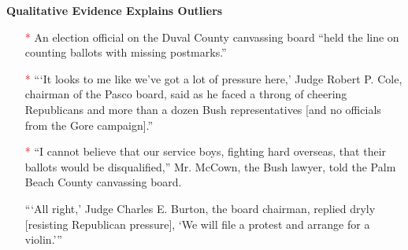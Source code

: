 \documentclass[landscape,letterpaper]{seminar}
\begin{document}
\begin{slide}
\centerline{\textbf{\small{Qualitative Evidence Explains Outliers}}}
\bigskip

\begin{itemize}
\item[\textcolor{Red}{*}] An election official on the Duval County canvassing board ``held
  the line on counting ballots with missing postmarks.''

\item[\textcolor{Red}{*}] ``\thinspace `It looks to me like we've got a lot of pressure here,' Judge
  Robert P.  Cole, chairman of the Pasco board, said as he faced a
  throng of cheering Republicans and more than a dozen Bush
  representatives [and no officials from the Gore campaign].''
  
\item[\textcolor{Red}{*}] ``I cannot believe that our service boys, fighting hard
  overseas, that their ballots would be disqualified,'' Mr. McCown,
  the Bush lawyer, told the Palm Beach County canvassing board.
                                                                                
  ``\thinspace `All right,' Judge Charles E. Burton, the board
  chairman, replied dryly [resisting Republican pressure], `We will
  file a protest and arrange for a violin.'\thinspace ''
\end{itemize}

\end{slide}

\end{document}
